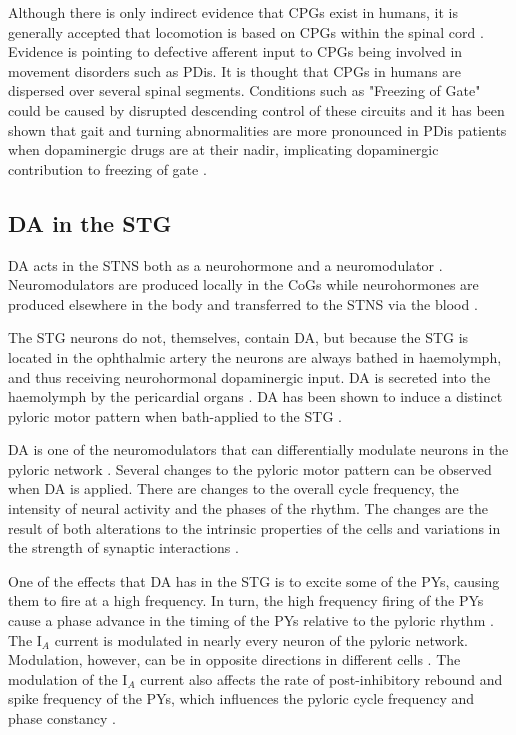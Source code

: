 Although there is only indirect evidence that \acp{CPG} exist in humans, it is generally accepted that locomotion is based on \acp{CPG} within the spinal cord \cite{Iosa2015}. Evidence is pointing to defective afferent input to \acp{CPG} being involved in movement disorders such as \ac{PDis}. It is thought that \acp{CPG} in humans are dispersed over several spinal segments. Conditions such as "Freezing of Gate" could be caused by disrupted descending control of these circuits and it has been shown that gait and turning abnormalities are more pronounced in \ac{PDis} patients when dopaminergic drugs are at their nadir, implicating dopaminergic contribution to freezing of gate \cite{Nutt2011}.

\subsection{\ac{DA} in the \ac{STG}}

\Ac{DA} acts in the \ac{STNS} both as a neurohormone and a neuromodulator \cite{Clark2008}. Neuromodulators are produced locally in the \acp{CoG} while neurohormones are produced elsewhere in the body and transferred to the \ac{STNS} via the blood \cite{Selverston1980a}. 

The \ac{STG} neurons do not, themselves, contain \ac{DA}, but because the \ac{STG} is located in the ophthalmic artery \cite{Claiborne1987} the neurons are always bathed in haemolymph, and thus receiving neurohormonal dopaminergic input. \ac{DA} is secreted into the haemolymph by the pericardial organs \cite{Clark2008}. \Ac{DA} has been shown to induce a distinct pyloric motor pattern when bath-applied to the \ac{STG} \cite{Johnson1990}.

\ac{DA} is one of the neuromodulators that can differentially modulate neurons in the pyloric network \cite{Clark2007}. Several changes to the pyloric motor pattern can be observed when \ac{DA} is applied. There are changes to the overall cycle frequency, the intensity of neural activity and the phases of the rhythm. The changes are the result of both alterations to the intrinsic properties of the cells and variations in the strength of synaptic interactions \cite{Harris-warrick1998}.

One of the effects that \ac{DA} has in the \ac{STG} is to excite some of the \acp{PY}, causing them to fire at a high frequency. In turn, the high frequency firing of the \acp{PY} cause a phase advance in the timing of the \acp{PY} relative to the pyloric rhythm \cite{Harris-Warrick1995}. The I$_A$ current is modulated in nearly every neuron of the pyloric network. Modulation, however, can be in opposite directions in different cells \cite{Harris-warrick1998, Baro1997}. The modulation of the I$_A$ current also affects the rate of post-inhibitory rebound and spike frequency of the \acp{PY}, which influences the pyloric cycle frequency and phase constancy \cite{Zhang2010}.

